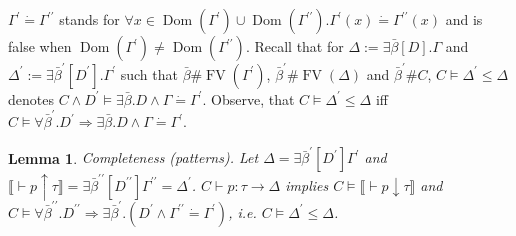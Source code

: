 \documentclass{article}
\newcommand{\assign}{:=}
\newcommand{\tmem}[1]{{\em #1\/}}
\newcommand{\tmop}[1]{\ensuremath{\operatorname{#1}}}
\newtheorem{lemma}{Lemma}
\begin{document}
$\Gamma^{\prime} \dot{=} \Gamma^{\prime\prime}$ stands for $\forall x \in
\tmop{Dom} (\Gamma^{\prime}) \cup \tmop{Dom} (\Gamma^{\prime\prime}) .
\Gamma^{\prime} (x) \dot{=} \Gamma^{\prime\prime} (x)$ and is false when
$\tmop{Dom} (\Gamma^{\prime}) \neq \tmop{Dom} (\Gamma^{\prime\prime})$. Recall
that for $\Delta \assign \exists \bar{\beta} [D] . \Gamma$ and
$\Delta^{\prime} \assign \exists \bar{\beta}^{\prime} [D^{\prime}] .
\Gamma^{\prime}$ such that $\bar{\beta} \# \tmop{FV} (\Gamma^{\prime})$,
$\bar{\beta}^{\prime} \# \tmop{FV} (\Delta)$ and $\bar{\beta}^{\prime} \#C$,
$C \vDash \Delta^{\prime} \leqslant \Delta$ denotes $C \wedge D^{\prime}
\vDash \exists \bar{\beta} .D \wedge \Gamma \dot{=} \Gamma^{\prime}$. Observe,
that $C \vDash \Delta^{\prime} \leqslant \Delta$ iff $C \vDash \forall
\bar{\beta}^{\prime} .D^{\prime} \Rightarrow \exists \bar{\beta} .D \wedge
\Gamma \dot{=} \Gamma^{\prime}$.

\begin{lemma}
  \label{CompletePat}{\tmem{Completeness}} (patterns). Let $\Delta = \exists
  \bar{\beta}^{\prime} [D^{\prime}] \Gamma^{\prime}$ and $\llbracket \vdash p
  \uparrow \tau \rrbracket = \exists \bar{\beta}^{\prime\prime}
  [D^{\prime\prime}] \Gamma^{\prime\prime} = \Delta^{\prime}$. $C \vdash p :
  \tau \longrightarrow \Delta$ implies $C \vDash \llbracket \vdash p
  \downarrow \tau \rrbracket$ and $C \vDash \forall \bar{\beta}^{\prime\prime}
  .D^{\prime\prime} \Rightarrow \exists \bar{\beta}^{\prime} . (D^{\prime}
  \wedge \Gamma^{\prime\prime} \dot{=} \Gamma^{\prime})$, i.e. $C \vDash
  \Delta^{\prime} \leqslant \Delta$.
\end{lemma}
\end{document}
